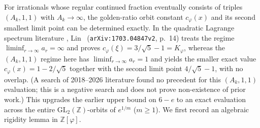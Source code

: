 \documentclass[11pt]{amsart}
\theoremstyle{definition}
\theoremstyle{remark}
\numberwithin{equation}{section}
\newcommand{\Z}{\mathbb{Z}}
\begin{document}
For irrationals whose regular continued fraction eventually consists of
triples $(A_k,1,1)$ with $A_k\to\infty$, the golden-ratio orbit constant
$c_\varphi(x)$ and its second smallest limit point can be determined
exactly. In the quadratic Lagrange spectrum literature
\cite{ParkkonenPaulin2011,BugeaudQuad,Pejkovic2016,Lin2018},
Lin~\cite[Lemma~4.2]{Lin2018} (\texttt{arXiv:1703.04847v2}, p.~14)
treats the regime $\liminf_{r\to\infty} a_r=\infty$ and proves
$c_\varphi(\xi)=3/\sqrt5-1=K_\varphi$, whereas the $(A_k,1,1)$ regime
here has $\liminf_{r\to\infty} a_r=1$ and yields the smaller exact value
$c_\varphi(x)=1-2/\sqrt5$ together with the second limit point
$4/\sqrt5-1$, with no overlap. (A search of 2018--2026 literature
found no precedent for this $(A_k,1,1)$ evaluation; this is a negative
search and does not prove non-existence of prior work.) This upgrades
the earlier upper bound on $6-e$ to an exact evaluation across the
entire $\mathrm{GL}_2(\Z)$-orbits of $e^{1/m}$ ($m\ge1$). We first
record an algebraic rigidity lemma in $\Z[\varphi]$.
\end{document}
